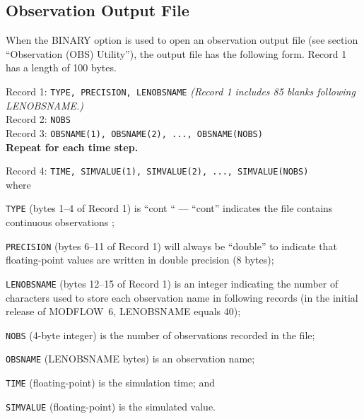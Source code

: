 \newpage
\subsection{Observation Output File}

When the BINARY option is used to open an observation output file (see section ``Observation (OBS) Utility''), the output file has the following form. Record 1 has a length of 100 bytes.

\vspace{5mm}
\noindent Record 1: \texttt{TYPE, PRECISION, LENOBSNAME} \textit{(Record 1 includes 85 blanks following LENOBSNAME.)} \\
\noindent Record 2: \texttt{NOBS} \\
\noindent Record 3: \texttt{OBSNAME(1),  OBSNAME(2), ..., OBSNAME(NOBS)} \\

\vspace{12pt}
\noindent \textbf{Repeat for each time step.}

\vspace{12pt}
\noindent Record 4: \texttt{TIME, SIMVALUE(1), SIMVALUE(2), ..., SIMVALUE(NOBS)} \\
 
\vspace{12pt}
\noindent where

\begin{description} \itemsep0pt \parskip0pt 
\item \texttt{TYPE} (bytes 1--4 of Record 1) is ``cont `` ---  ``cont'' indicates the file contains continuous observations ;
\item \texttt{PRECISION} (bytes 6--11 of Record 1) will always be ``double'' to indicate that floating-point values are written in double precision (8 bytes);
\item \texttt{LENOBSNAME} (bytes 12--15 of Record 1) is an integer indicating the number of characters used to store each observation name in following records (in the initial release of MODFLOW~6, LENOBSNAME equals 40);
\item \texttt{NOBS} (4-byte integer) is the number of observations recorded in the file;
\item \texttt{OBSNAME} (LENOBSNAME bytes) is an observation name;
\item \texttt{TIME} (floating-point) is the simulation time; and
\item \texttt{SIMVALUE} (floating-point) is the simulated value.
\end{description}
